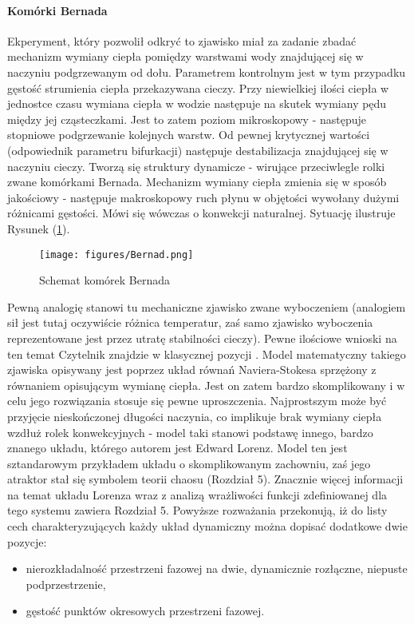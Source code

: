 \documentclass[12pt, twoside]{book}
\begin{document}
\paragraph{Komórki Bernada}
Ekperyment, który pozwolił odkryć to zjawisko miał za zadanie zbadać mechanizm wymiany ciepła pomiędzy warstwami wody znajdującej się w naczyniu podgrzewanym od dołu. Parametrem kontrolnym jest w tym przypadku gęstość strumienia ciepła przekazywana cieczy. Przy niewielkiej ilości ciepła w jednostce czasu wymiana ciepła w wodzie następuje na skutek wymiany pędu między jej cząsteczkami. Jest to zatem poziom mikroskopowy - następuje stopniowe podgrzewanie kolejnych warstw. Od pewnej krytycznej wartości (odpowiednik parametru bifurkacji) następuje destabilizacja znajdującej się w naczyniu cieczy. Tworzą się struktury dynamicze - wirujące przeciwlegle rolki zwane komórkami Bernada. Mechanizm wymiany ciepła zmienia się w sposób jakościowy - następuje makroskopowy ruch płynu w objętości wywołany dużymi różnicami gęstości. Mówi się wówczas o konwekcji naturalnej. Sytuację ilustruje Rysunek (\ref{Fig12}).
\begin{figure}[H]
	\texttt{[image: figures/Bernad.png]} 
	\centering
	\caption{Schemat komórek Bernada}
	\label{Fig12}
\end{figure}
Pewną analogię stanowi tu mechaniczne zjawisko zwane wyboczeniem (analogiem sił jest tutaj oczywiście różnica temperatur, zaś samo zjawisko wyboczenia reprezentowane jest przez utratę stabilności cieczy). Pewne ilościowe wnioski na ten temat Czytelnik znajdzie w klasycznej pozycji \cite{Landau}.\newline
Model matematyczny takiego zjawiska opisywany jest poprzez układ równań Naviera-Stokesa sprzężony z równaniem opisującym wymianę ciepła. Jest on zatem bardzo skomplikowany i w celu jego rozwiązania stosuje się pewne uproszczenia. Najprostszym może być przyjęcie nieskończonej długości naczynia, co implikuje brak wymiany ciepła wzdłuż rolek konwekcyjnych - model taki stanowi podstawę innego, bardzo znanego układu, którego autorem jest Edward Lorenz. Model ten jest sztandarowym przykładem układu o skomplikowanym zachowniu, zaś jego atraktor stał się symbolem teorii chaosu (Rozdział 5). Znacznie więcej informacji na temat układu Lorenza wraz z analizą wrażliwości funkcji zdefiniowanej dla tego systemu zawiera Rozdział 5.\newline
Powyższe rozważania przekonują, iż do listy cech charakteryzujących każdy układ dynamiczny można dopisać dodatkowe dwie pozycje:
\begin{itemize}
	\item nierozkładalność przestrzeni fazowej na dwie, dynamicznie rozłączne, niepuste podprzestrzenie,
	\item gęstość punktów okresowych przestrzeni fazowej.
\end{itemize}
\end{document}
